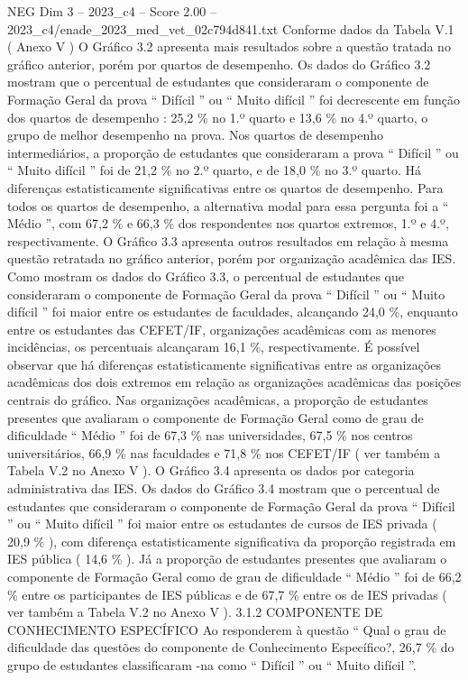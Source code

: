 \begin{textsample}{NEG Dim 3 – 2023\_c4 – Score 2.00 – 2023\_c4/enade\_2023\_med\_vet\_02c794d841.txt}
Conforme dados da Tabela V.1 ( Anexo V ) O Gráfico 3.2 apresenta mais resultados sobre a questão tratada no gráfico anterior, porém por quartos de desempenho.
Os dados do Gráfico 3.2 mostram que o percentual de estudantes que consideraram o componente de Formação Geral da prova “ Difícil ” ou “ Muito difícil ” foi decrescente em função dos quartos de desempenho : 25,2 \% no 1.º quarto e 13,6 \% no 4.º quarto, o grupo de melhor desempenho na prova.
Nos quartos de desempenho intermediários, a proporção de estudantes que consideraram a prova “ Difícil ” ou “ Muito difícil ” foi de 21,2 \% no 2.º quarto, e de 18,0 \% no 3.º quarto.
Há diferenças estatisticamente significativas entre os quartos de desempenho.
Para todos os quartos de desempenho, a alternativa modal para essa pergunta foi a “ Médio ”, com 67,2 \% e 66,3 \% dos respondentes nos quartos extremos, 1.º e 4.º, respectivamente.
O Gráfico 3.3 apresenta outros resultados em relação à mesma questão retratada no gráfico anterior, porém por organização acadêmica das IES.
Como mostram os dados do Gráfico 3.3, o percentual de estudantes que consideraram o componente de Formação Geral da prova “ Difícil ” ou “ Muito difícil ” foi maior entre os estudantes de faculdades, alcançando 24,0 \%, enquanto entre os estudantes das CEFET/IF, organizações acadêmicas com as menores incidências, os percentuais alcançaram 16,1 \%, respectivamente.
É possível observar que há diferenças estatisticamente significativas entre as organizações acadêmicas dos dois extremos em relação as organizações acadêmicas das posições centrais do gráfico.
Nas organizações acadêmicas, a proporção de estudantes presentes que avaliaram o componente de Formação Geral como de grau de dificuldade “ Médio ” foi de 67,3 \% nas universidades, 67,5 \% nos centros universitários, 66,9 \% nas faculdades e 71,8 \% nos CEFET/IF ( ver também a Tabela V.2 no Anexo V ).
O Gráfico 3.4 apresenta os dados por categoria administrativa das IES.
Os dados do Gráfico 3.4 mostram que o percentual de estudantes que consideraram o componente de Formação Geral da prova “ Difícil ” ou “ Muito difícil ” foi maior entre os estudantes de cursos de IES privada ( 20,9 \% ), com diferença estatisticamente significativa da proporção registrada em IES pública ( 14,6 \% ).
Já a proporção de estudantes presentes que avaliaram o componente de Formação Geral como de grau de dificuldade “ Médio ” foi de 66,2 \% entre os participantes de IES públicas e de 67,7 \% entre os de IES privadas ( ver também a Tabela V.2 no Anexo V ). 3.1.2 COMPONENTE DE CONHECIMENTO ESPECÍFICO Ao responderem à questão “ Qual o grau de dificuldade das questões do componente de Conhecimento Específico?, 26,7 \% do grupo de estudantes classificaram -na como “ Difícil ” ou “ Muito difícil ”.

\end{textsample}
